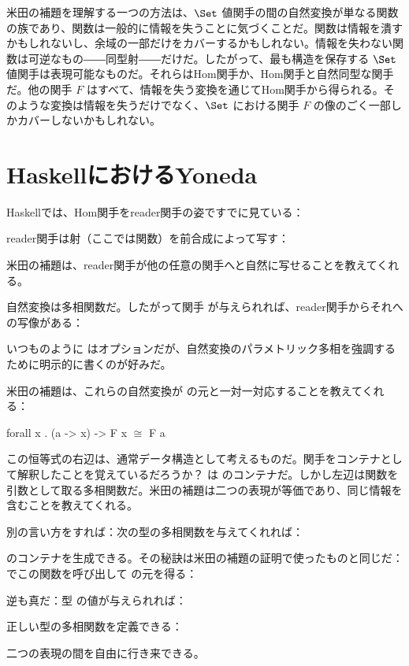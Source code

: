 米田の補題を理解する一つの方法は、$\Set$ 値関手の間の自然変換が単なる関数の族であり、関数は一般的に情報を失うことに気づくことだ。関数は情報を潰すかもしれないし、余域の一部だけをカバーするかもしれない。情報を失わない関数は可逆なもの――同型射――だけだ。したがって、最も構造を保存する $\Set$ 値関手は表現可能なものだ。それらはHom関手か、Hom関手と自然同型な関手だ。他の関手 $F$ はすべて、情報を失う変換を通じてHom関手から得られる。そのような変換は情報を失うだけでなく、$\Set$ における関手 $F$ の像のごく一部しかカバーしないかもしれない。

\section{HaskellにおけるYoneda}

Haskellでは、Hom関手をreader関手の姿ですでに見ている：

reader関手は射（ここでは関数）を前合成によって写す：

米田の補題は、reader関手が他の任意の関手へと自然に写せることを教えてくれる。

自然変換は多相関数だ。したがって関手  が与えられれば、reader関手からそれへの写像がある：

いつものように  はオプションだが、自然変換のパラメトリック多相を強調するために明示的に書くのが好みだ。

米田の補題は、これらの自然変換が  の元と一対一対応することを教えてくれる：

\begin{snipv}
forall x . (a -> x) -> F x \ensuremath{\cong} F a
\end{snipv}
この恒等式の右辺は、通常データ構造として考えるものだ。関手をコンテナとして解釈したことを覚えているだろうか？ は  のコンテナだ。しかし左辺は関数を引数として取る多相関数だ。米田の補題は二つの表現が等価であり、同じ情報を含むことを教えてくれる。

別の言い方をすれば：次の型の多相関数を与えてくれれば：

 のコンテナを生成できる。その秘訣は米田の補題の証明で使ったものと同じだ： でこの関数を呼び出して  の元を得る：

逆も真だ：型  の値が与えられれば：

正しい型の多相関数を定義できる：

二つの表現の間を自由に行き来できる。

